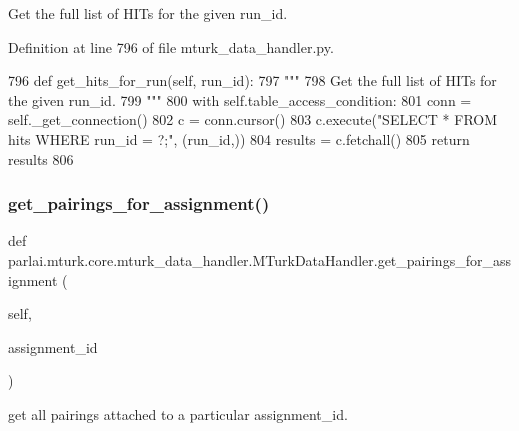 \begin{DoxyVerb}Get the full list of HITs for the given run_id.
\end{DoxyVerb}
 

Definition at line 796 of file mturk\+\_\+data\+\_\+handler.\+py.


\begin{DoxyCode}
796     \textcolor{keyword}{def }get\_hits\_for\_run(self, run\_id):
797         \textcolor{stringliteral}{"""}
798 \textcolor{stringliteral}{        Get the full list of HITs for the given run\_id.}
799 \textcolor{stringliteral}{        """}
800         with self.table\_access\_condition:
801             conn = self.\_get\_connection()
802             c = conn.cursor()
803             c.execute(\textcolor{stringliteral}{"SELECT * FROM hits WHERE run\_id = ?;"}, (run\_id,))
804             results = c.fetchall()
805             \textcolor{keywordflow}{return} results
806 
\end{DoxyCode}
\mbox{\label{classparlai_1_1mturk_1_1core_1_1mturk__data__handler_1_1MTurkDataHandler_a092a03e29a20f0b40b9d33e1e002395a}} 
\subsubsection{\texorpdfstring{get\+\_\+pairings\+\_\+for\+\_\+assignment()}{get\_pairings\_for\_assignment()}}
{\footnotesize\ttfamily def parlai.\+mturk.\+core.\+mturk\+\_\+data\+\_\+handler.\+M\+Turk\+Data\+Handler.\+get\+\_\+pairings\+\_\+for\+\_\+assignment (\begin{DoxyParamCaption}\item[{}]{self,  }\item[{}]{assignment\+\_\+id }\end{DoxyParamCaption})}

\begin{DoxyVerb}get all pairings attached to a particular assignment_id.
\end{DoxyVerb}
 

